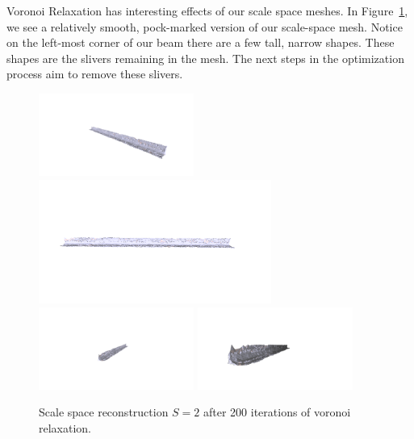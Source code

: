 \documentclass[12pt]{drexelthesis}
\begin{document}
Voronoi Relaxation has interesting effects of our scale space meshes. In Figure~\ref{zeronoise:scalespace2lloyd}, we see a relatively smooth, pock-marked version of our scale-space mesh. Notice on the left-most corner of our beam there are a few tall, narrow shapes. These shapes are the slivers remaining in the mesh. The next steps in the optimization process aim to remove these slivers.

\begin{figure}[!ht]
	
	\centering
		\includegraphics[trim={6in 2in 3in 3in},clip,width=2in]{simulated-lab-scan/0noise/optimized/scalespace2Lloyd30s200it00.png}
		\includegraphics[trim={3in 2in 3in 2in}, clip, width=3in]{simulated-lab-scan/0noise/optimized/scalespace2Lloyd30s200it01.png}
		\includegraphics[trim={6in 2in 3in 3in},clip,width=2in]{simulated-lab-scan/0noise/optimized/scalespace2Lloyd30s200it02.png}
		\includegraphics[trim={3in 2in 3.5in 3in},clip,width=2in]{simulated-lab-scan/0noise/optimized/scalespace2Lloyd30s200it03.png}
		\caption[Scale space reconstruction $S = 2$ after 200 iterations of voronoi relaxation]{\centering Scale space reconstruction $S = 2$ after 200 iterations of voronoi relaxation.}
	\label{zeronoise:scalespace2lloyd}
\end{figure}
\end{document}
